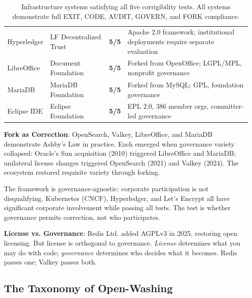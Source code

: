 \begin{table}[htbp]
\begin{tabular}{@{}l>{\raggedright}p{3.2cm}>{\centering\arraybackslash}p{1.2cm}p{5.8cm}@{}}
\rowcolor{green!8}
Hyperledger & LF Decentralized Trust & \textbf{5/5} & Apache 2.0 framework; institutional deployments require separate evaluation \\
LibreOffice & Document Foundation & \textbf{5/5} & Forked from OpenOffice; LGPL/MPL, nonprofit governance \\
\rowcolor{green!8}
MariaDB & MariaDB Foundation & \textbf{5/5} & Forked from MySQL; GPL, foundation governance \\
Eclipse IDE & Eclipse Foundation & \textbf{5/5} & EPL 2.0, 386 member orgs, committer-led governance \\
\bottomrule
\end{tabular}
\caption{Infrastructure systems satisfying all five corrigibility tests. All systems demonstrate full EXIT, CODE, AUDIT, GOVERN, and FORK compliance.}
\label{tab:positive}
\end{table}

\textbf{Fork as Correction}: OpenSearch, Valkey, LibreOffice, and MariaDB demonstrate Ashby's Law in practice. Each emerged when governance variety collapsed: Oracle's Sun acquisition (2010) triggered LibreOffice and MariaDB; unilateral license changes triggered OpenSearch (2021) and Valkey (2024). The ecosystem restored requisite variety through forking.

The framework is governance-agnostic: corporate participation is not disqualifying. Kubernetes (CNCF), Hyperledger, and Let's Encrypt all have significant corporate involvement while passing all tests. The test is whether governance permits correction, not who participates.

\textbf{License vs. Governance}: Redis Ltd. added AGPLv3 in 2025, restoring open licensing. But license is orthogonal to governance. \textit{License} determines what you may do with code; \textit{governance} determines who decides what it becomes. Redis passes one; Valkey passes both.

\subsection{The Taxonomy of Open-Washing}
\label{subsec:openwashing}

